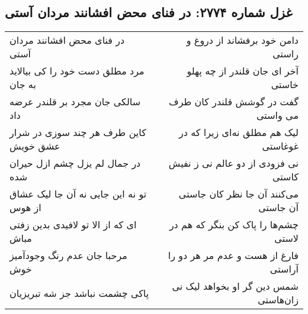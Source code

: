 \begin{center}
\section*{غزل شماره ۲۷۷۴: در فنای محض افشانند مردان آستی}
\label{sec:2774}
\begin{longtable}{l p{0.5cm} r}
در فنای محض افشانند مردان آستی
&&
دامن خود برفشاند از دروغ و راستی
\\
مرد مطلق دست خود را کی بیالاید به جان
&&
آخر ای جان قلندر از چه پهلو خاستی
\\
سالکی جان مجرد بر قلندر عرضه داد
&&
گفت در گوشش قلندر کان طرف می واستی
\\
کاین طرف هر چند سوزی در شرار عشق خویش
&&
لیک هم مطلق نه‌ای زیرا که در غوغاستی
\\
در جمال لم یزل چشم ازل حیران شده
&&
نی فزودی از دو عالم نی ز نفیش کاستی
\\
تو نه این جایی نه آن جا لیک عشاق از هوس
&&
می‌کنند آن جا نظر کان جاستی آن جاستی
\\
ای که از الا تو لافیدی بدین زفتی مباش
&&
چشم‌ها را پاک کن بنگر که هم در لاستی
\\
مرحبا جان عدم رنگ وجودآمیز خوش
&&
فارغ از هست و عدم مر هر دو را آراستی
\\
پاکی چشمت نباشد جز شه تبریزیان
&&
شمس دین گر او بخواهد لیک نی زان‌هاستی
\\
\end{longtable}
\end{center}
